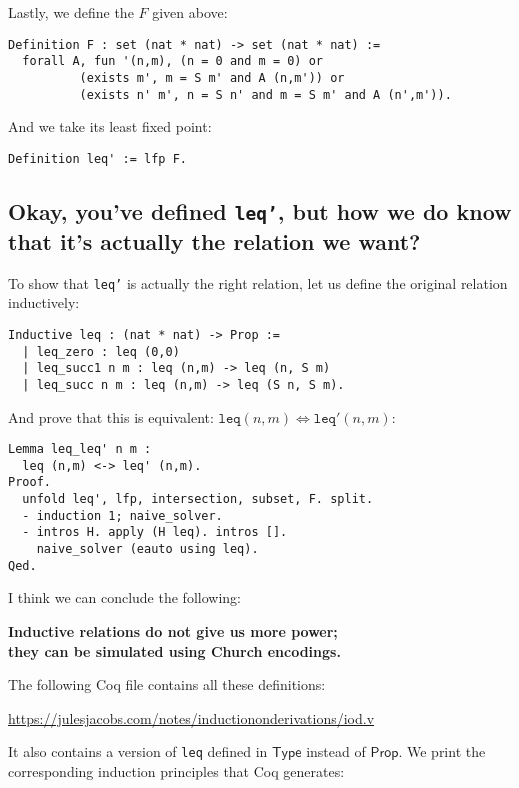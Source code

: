 \documentclass[a4paper, 11pt]{article}
\theoremstyle{definition}
\begin{document}
Lastly, we define the $F$ given above:
\begin{lstlisting}
Definition F : set (nat * nat) -> set (nat * nat) :=
  forall A, fun '(n,m), (n = 0 and m = 0) or
          (exists m', m = S m' and A (n,m')) or
          (exists n' m', n = S n' and m = S m' and A (n',m')).
\end{lstlisting}

And we take its least fixed point:
\begin{lstlisting}
Definition leq' := lfp F.
\end{lstlisting}

\subsection*{Okay, you've defined \texttt{leq'}, but how we do know that it's actually the relation we want?}

To show that \texttt{leq'} is actually the right relation, let us define the original relation inductively:

\begin{lstlisting}
Inductive leq : (nat * nat) -> Prop :=
  | leq_zero : leq (0,0)
  | leq_succ1 n m : leq (n,m) -> leq (n, S m)
  | leq_succ n m : leq (n,m) -> leq (S n, S m).
\end{lstlisting}

And prove that this is equivalent: $\mathtt{leq}(n,m) \iff \mathtt{leq'}(n,m)$:

\begin{lstlisting}
Lemma leq_leq' n m :
  leq (n,m) <-> leq' (n,m).
Proof.
  unfold leq', lfp, intersection, subset, F. split.
  - induction 1; naive_solver.
  - intros H. apply (H leq). intros [].
    naive_solver (eauto using leq).
Qed.
\end{lstlisting}

I think we can conclude the following:

\begin{center}
  \textbf{Inductive relations do not give us more power; \\
  they can be simulated using Church encodings.}
\end{center}

The following Coq file contains all these definitions:

\begin{center}
  \url{https://julesjacobs.com/notes/inductiononderivations/iod.v}
\end{center}

It also contains a version of \texttt{leq} defined in $\mathsf{Type}$ instead of $\mathsf{Prop}$. We print the corresponding induction principles that Coq generates:
\end{document}
